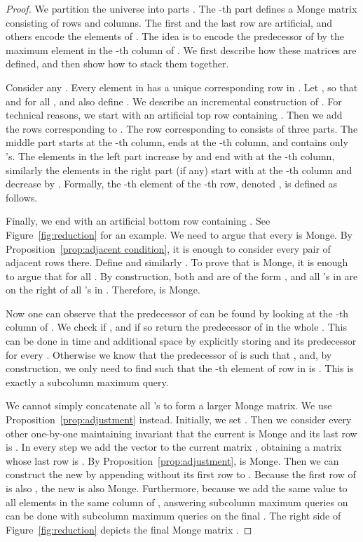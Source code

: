 \documentclass{llncs}
\begin{document}
\begin{proof}


We partition the universe  into  parts . The -th part 
defines a Monge matrix  consisting of  rows and  columns. The first and the last row are artificial, and others encode the
elements of .
The idea is to encode the predecessor of  by the
maximum element in the -th column
of . 
 We first describe
how these matrices are defined, and then show how to stack them together.

Consider any . Every element in  has a unique
corresponding row in .
Let , so that 
and  for all , and also define . We
describe an incremental construction of .
For technical reasons, we start with an artificial top row containing . Then we add the rows corresponding
to . The row corresponding to  consists of three parts. The middle part starts at the
-th column, ends at the -th column, and contains only 's. The elements in the left part 
increase by  and end with  at the -th column, similarly
the elements in the right part (if any) start with  at the
-th column and decrease by .
Formally, the -th element of the -th row, denoted , is defined as follows.



Finally, we end with an artificial bottom row containing .
See Figure~\ref{fig:reduction} for an example. We need to argue that every  is Monge. By
Proposition~\ref{prop:adjacent condition}, it is enough to consider every pair of adjacent rows  there.
Define  and similarly . To prove that  is Monge, it is
enough to argue that  for all . By construction, both  and  are of the form
, and all 's in  are on the right of all 's in .
Therefore,  is Monge.

Now one can observe that the predecessor of  can be found by looking at the -th column
of . We check if , and if so return the predecessor of  in the whole .
This can be done in  time and  additional space by explicitly storing  and its predecessor for every .
Otherwise we know that the predecessor of  is  such that , and, 
by construction, we only need to find  such that the -th element of row  in  is .
This is exactly a subcolumn maximum query.

We cannot simply concatenate all 's to form a larger Monge matrix. We use Proposition~\ref{prop:adjustment}
instead. Initially, we set . Then we consider every other  one-by-one maintaining invariant
that the current  is Monge and its last row is . In every step we add the vector 
 to the current matrix , obtaining a matrix  whose last row is . By Proposition~\ref{prop:adjustment},  is Monge. 
Then we can construct the new  by appending  without its first row to .
Because the first row of  is also , the new  is also Monge. Furthermore, because we add the
same value to all elements in the same column of , answering subcolumn maximum queries on  can
be done with subcolumn maximum queries on the final .  The right side of Figure~\ref{fig:reduction} depicts
the final Monge matrix .


\end{proof}
\end{document}
